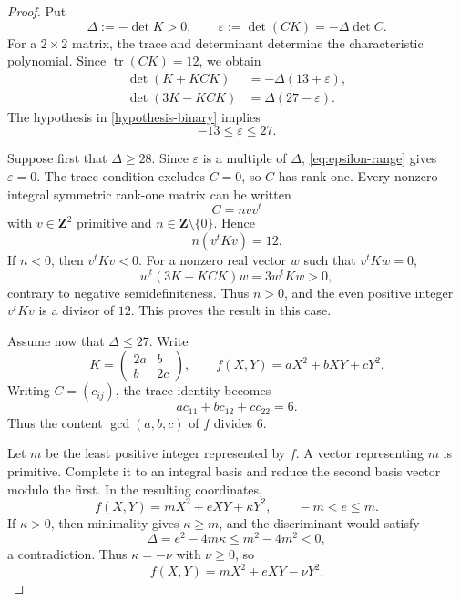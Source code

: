 \documentclass[12pt]{amsart}
\numberwithin{equation}{section}
\theoremstyle{definition}
\theoremstyle{remark}
\newcommand{\Z}{\mathbf Z}
\newcommand{\tr}{\operatorname{tr}}
\begin{document}
\begin{proof}
Put
\[
                   \Delta:=-\det K>0,
          \qquad \varepsilon:=\det(CK)=-\Delta\det C.
\]
For a $2\times2$ matrix, the trace and determinant determine the
characteristic polynomial.  Since $\tr(CK)=12$, we obtain
\begin{align}
 \det(K+KCK)&=-\Delta(13+\varepsilon),\label{eq:binary-det-plus}\\
 \det(3K-KCK)&=\Delta(27-\varepsilon).\label{eq:binary-det-minus}
\end{align}
The hypothesis in \eqref{hypothesis-binary}
implies
\begin{equation}\label{eq:epsilon-range}
                         -13\leq\varepsilon\leq27.
\end{equation}

Suppose first that $\Delta\geq28$.  Since $\varepsilon$ is a multiple
of $\Delta$, \eqref{eq:epsilon-range} gives $\varepsilon=0$.  The trace
condition excludes $C=0$, so $C$ has rank one.  Every nonzero integral
symmetric rank-one matrix can be written
\[
                              C=nvv^t
\]
with $v\in\Z^2$ primitive and $n\in\Z\setminus\{0\}$.  Hence
\[
                              n(v^tKv)=12.
\]
If $n<0$, then $v^tKv<0$.  For a nonzero real vector $w$ such that $v^tKw = 0$,
\[
 w^t(3K-KCK)w=3w^tKw>0,
\]
contrary to negative semidefiniteness.  Thus $n>0$, and the even
positive integer $v^tKv$ is a divisor of $12$.  This proves the result
in this case.

Assume now that $\Delta\leq27$.  Write
\[
 K=\begin{pmatrix}2a&b\\ b&2c\end{pmatrix},
 \qquad f(X,Y)=aX^2+bXY+cY^2.
\]
Writing $C=(c_{ij})$, the trace identity becomes
\[
                         ac_{11}+bc_{12}+cc_{22}=6.
\]
Thus the content $\gcd(a,b,c)$ of $f$ divides $6$.

Let $m$ be the least positive integer represented by $f$.  A vector
representing $m$ is primitive.  Complete it to an integral basis and
reduce the second basis vector modulo the first.  In the resulting
coordinates,
\[
                 f(X,Y)=mX^2+eXY+\kappa Y^2,
                 \qquad -m<e\leq m.
\]
If $\kappa>0$, then minimality gives $\kappa\geq m$, and the
discriminant would satisfy
\[
                  \Delta=e^2-4m\kappa\leq m^2-4m^2<0,
\]
a contradiction.  Thus $\kappa=-\nu$ with $\nu\geq0$, so
\begin{equation}\label{eq:binary-reduced}
                 f(X,Y)=mX^2+eXY-\nu Y^2.
\end{equation}


\end{proof}
\end{document}
